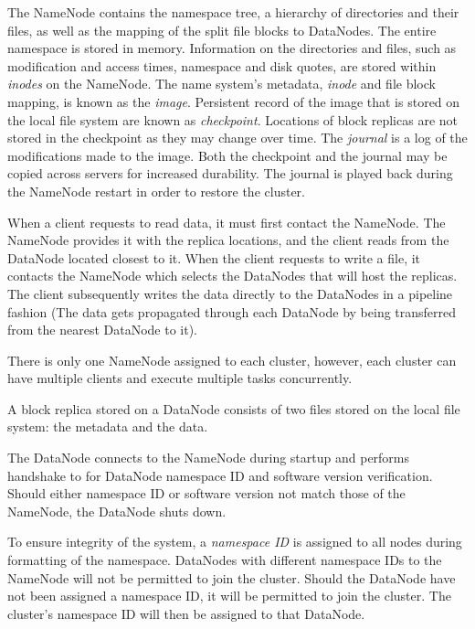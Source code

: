 \documentclass{report}
\begin{document}
        The NameNode contains the namespace tree, a hierarchy of 
        directories and their files, as well as the mapping of the 
        split file blocks to DataNodes. The entire namespace is 
        stored in memory. Information on the directories and files,
        such as modification and access times, namespace and disk 
        quotes, are stored within \textit{inodes} on the NameNode. 
        The name system's metadata, \textit{inode} and file block 
        mapping, is known as the \textit{image}. Persistent record 
        of the image that is stored on the local file system are 
        known as \textit{checkpoint}. Locations of block replicas 
        are not stored in the checkpoint as they may change over 
        time. The \textit{journal} is a log of the modifications 
        made to the image. Both the checkpoint and the journal may 
        be copied across servers for increased durability. The 
        journal is played back during the NameNode restart in order 
        to restore the cluster.

        When a client requests to read data, it must first contact 
        the NameNode. The NameNode provides it with the replica 
        locations, and the client reads from the DataNode located 
        closest to it. When the client requests to write a file, it
        contacts the NameNode which selects the DataNodes that will 
        host the replicas. The client subsequently writes the data 
        directly to the DataNodes in a pipeline fashion (The data 
        gets propagated through each DataNode by being transferred
        from the nearest DataNode to it).

        There is only one NameNode assigned to each cluster, however, 
        each cluster can have multiple clients and execute multiple 
        tasks concurrently.


        A block replica stored on a DataNode consists of two files 
        stored on the local file system: the metadata and the data. 

        The DataNode connects to the NameNode during startup and 
        performs handshake to for DataNode namespace ID and 
        software version verification. Should either namespace ID 
        or software version not match those of the NameNode, the 
        DataNode shuts down.

        To ensure integrity of the system, a \textit{namespace ID} 
        is assigned to all nodes during formatting of the namespace. 
        DataNodes with different namespace IDs to the NameNode will 
        not be permitted to join the cluster. Should the DataNode
        have not been assigned a namespace ID, it will be permitted 
        to join the cluster. The cluster's namespace ID will then be 
        assigned to that DataNode.
\end{document}
